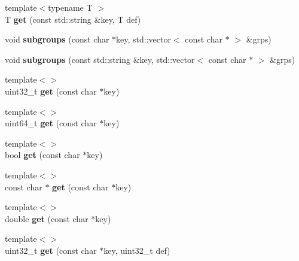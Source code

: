 \begin{DoxyCompactItemize}
\item 
\hypertarget{classConfig_a1389961bf83660636d1a09c0d3fcd12a}{{\footnotesize template$<$typename T $>$ }\\T {\bfseries get} (const std\-::string \&key, T def)}\label{classConfig_a1389961bf83660636d1a09c0d3fcd12a}

\item 
\hypertarget{classConfig_a27543c26c56e81e436ed3d3b533f4b6e}{void {\bfseries subgroups} (const char $\ast$key, std\-::vector$<$ const char $\ast$ $>$ \&grps)}\label{classConfig_a27543c26c56e81e436ed3d3b533f4b6e}

\item 
\hypertarget{classConfig_a3950588dcea9c919e7f6d58c4904514d}{void {\bfseries subgroups} (const std\-::string \&key, std\-::vector$<$ const char $\ast$ $>$ \&grps)}\label{classConfig_a3950588dcea9c919e7f6d58c4904514d}

\item 
\hypertarget{classConfig_a89ec1c95c45bfd3eedca3eb47d7e6b66}{{\footnotesize template$<$$>$ }\\uint32\-\_\-t {\bfseries get} (const char $\ast$key)}\label{classConfig_a89ec1c95c45bfd3eedca3eb47d7e6b66}

\item 
\hypertarget{classConfig_a83e49ae726af6b833f6d655471980426}{{\footnotesize template$<$$>$ }\\uint64\-\_\-t {\bfseries get} (const char $\ast$key)}\label{classConfig_a83e49ae726af6b833f6d655471980426}

\item 
\hypertarget{classConfig_a35b80ae4143a735dbb8cd979e31d9f30}{{\footnotesize template$<$$>$ }\\bool {\bfseries get} (const char $\ast$key)}\label{classConfig_a35b80ae4143a735dbb8cd979e31d9f30}

\item 
\hypertarget{classConfig_a868b65b13b4d843b22126a73e0d119b4}{{\footnotesize template$<$$>$ }\\const char $\ast$ {\bfseries get} (const char $\ast$key)}\label{classConfig_a868b65b13b4d843b22126a73e0d119b4}

\item 
\hypertarget{classConfig_a9fb644c76122da00f0396cca69fdb854}{{\footnotesize template$<$$>$ }\\double {\bfseries get} (const char $\ast$key)}\label{classConfig_a9fb644c76122da00f0396cca69fdb854}

\item 
\hypertarget{classConfig_a01503b0fe03e702ac42cc71025496cc7}{{\footnotesize template$<$$>$ }\\uint32\-\_\-t {\bfseries get} (const char $\ast$key, uint32\-\_\-t def)}\label{classConfig_a01503b0fe03e702ac42cc71025496cc7}


\end{DoxyCompactItemize}
